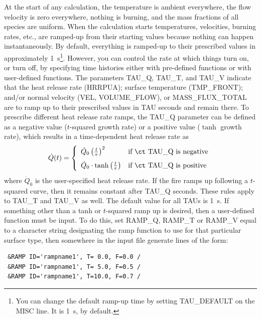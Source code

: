 \documentclass[11pt]{book}
\begin{document}
At the start of any calculation, the temperature is ambient everywhere, the flow velocity is zero everywhere, nothing is burning, and the mass fractions of all species are uniform.  When the calculation starts temperatures, velocities, burning rates, etc., are ramped-up from their starting values because nothing can happen instantaneously. By default, everything is ramped-up to their prescribed values in approximately 1~s\footnote{You can change the default ramp-up time by setting {\ct TAU\_DEFAULT} on the {\ct MISC} line. It is 1~s, by default.}. However, you can control the rate at which things turn on, or turn off, by specifying time histories either with pre-defined functions or with user-defined functions.  The parameters {\ct TAU\_Q}, {\ct TAU\_T}, and {\ct TAU\_V} indicate that the heat release rate ({\ct HRRPUA}); surface temperature ({\ct TMP\_FRONT}); and/or normal velocity ({\ct VEL}, {\ct VOLUME\_FLOW}), or {\ct MASS\_FLUX\_TOTAL} are to ramp up to their prescribed values in {\ct TAU} seconds and remain there. To prescribe different heat release rate ramps, the {\ct TAU\_Q} parameter can be defined as a negative value ($t$-squared growth rate) or a positive value ($\tanh$ growth rate), which results in a time-dependent heat release rate as
\begin{equation}
\dot Q(t) = \left\{ \begin{array}{ll} \dot Q_0 \left( \frac{t}{\tau} \right)^2            &  \mbox{if {\ct TAU\_Q} is negative} \\[.1in]
                                      \dot Q_0 \cdot \tanh \left( \frac{t}{\tau} \right)  &  \mbox{if {\ct TAU\_Q} is positive}  \end{array} \right.
\end{equation}
where $\dot Q_0$ is the user-specified heat release rate. If the fire ramps up following a $t$-squared curve, then it remains constant after {\ct TAU\_Q} seconds.  These rules apply to {\ct TAU\_T} and {\ct TAU\_V} as well. The default value for all {\ct TAU}s is 1~s.  If something other than a tanh or $t$-squared ramp up is desired, then a user-defined function must be input. To do this, set {\ct RAMP\_Q}, {\ct RAMP\_T} or {\ct RAMP\_V} equal to a character string designating the ramp function to use for that particular surface type, then somewhere in the input file generate lines of the form:
\begin{lstlisting}
 &RAMP ID='rampname1', T= 0.0, F=0.0 /
 &RAMP ID='rampname1', T= 5.0, F=0.5 /
 &RAMP ID='rampname1', T=10.0, F=0.7 /
\end{lstlisting}
\end{document}
